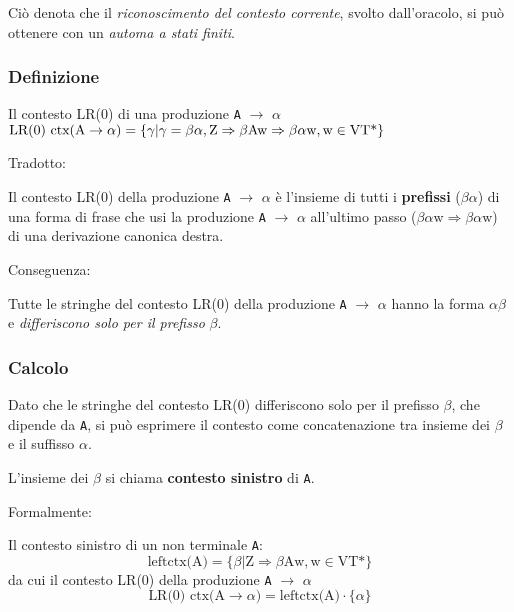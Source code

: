 Ciò denota che il \textit{riconoscimento del contesto corrente}, svolto dall'oracolo, si può ottenere con un \textit{automa a stati finiti}. 

\subsubsection{Definizione}
\begin{mdframed}[topline=false,bottomline=false,rightline=false]
Il contesto LR(0) di una produzione \texttt{A} $\rightarrow$ $\alpha$\\
$\text{LR(0) ctx(\text{A}} \rightarrow \alpha) = \{\gamma | \gamma = \beta\alpha, \text{Z}\Rightarrow \beta\text{Aw} \Rightarrow \beta \alpha \text{w}, \text{w} \in \text{VT*}\}$
\end{mdframed}

Tradotto:
\begin{mdframed}[topline=false,bottomline=false,rightline=false]
Il contesto LR(0) della produzione \texttt{A} $\rightarrow$ $\alpha$ è l'insieme di tutti i \textbf{prefissi} ($\beta\alpha$) di una forma di frase che usi la produzione \texttt{A} $\rightarrow$ $\alpha$ all'ultimo passo ($\beta\alpha\text{w} \Rightarrow \beta\alpha\text{w}$) di una derivazione canonica destra.
\end{mdframed}
Conseguenza:
\begin{mdframed}[topline=false,bottomline=false,rightline=false]
Tutte le stringhe del contesto LR(0) della produzione \texttt{A} $\rightarrow$ $\alpha$ hanno la forma $\alpha\beta$ e \textit{differiscono solo per il prefisso} $\beta$.
\end{mdframed}

\subsubsection{Calcolo}
Dato che le stringhe del contesto LR(0) differiscono solo per il prefisso $\beta$, che dipende da \texttt{A}, si può esprimere il contesto come concatenazione tra insieme dei $\beta$ e il suffisso $\alpha$.

L'insieme dei $\beta$ si chiama \textbf{contesto sinistro} di \texttt{A}.

Formalmente:
\begin{mdframed}[topline=false,bottomline=false,rightline=false]
Il contesto sinistro di un non terminale \texttt{A}:
\begin{equation*}
    \text{leftctx(A)} = \{\beta | \text{Z} \Rightarrow \beta\text{Aw}, \text{w} \in \text{VT*}\}
\end{equation*}
da cui il contesto LR(0) della produzione \texttt{A} $\rightarrow$ $\alpha$
\begin{equation*}
    \text{LR(0) ctx(A}\rightarrow\alpha) = \text{leftctx(A)} \cdot \{\alpha\}
\end{equation*}
\end{mdframed}


